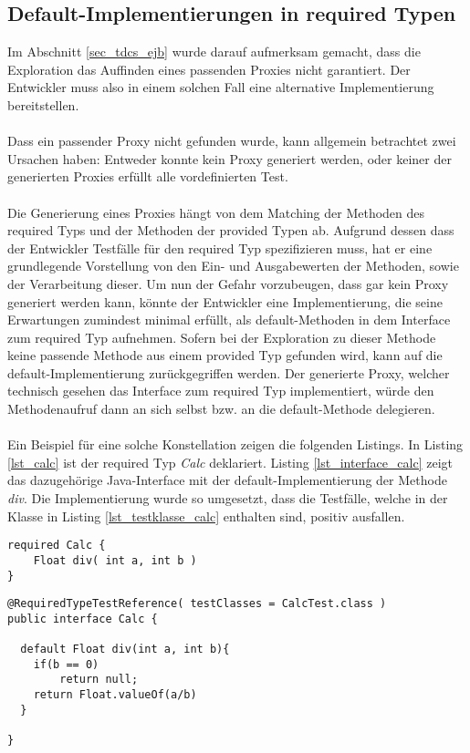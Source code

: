 \subsection{Default-Implementierungen in required Typen}
Im Abschnitt \ref{sec_tdcs_ejb} wurde darauf aufmerksam gemacht, dass die Exploration das Auffinden eines passenden Proxies nicht garantiert. Der Entwickler muss also in einem solchen Fall eine alternative Implementierung bereitstellen.
\\\\
Dass ein passender Proxy nicht gefunden wurde, kann allgemein betrachtet zwei Ursachen haben: Entweder konnte kein Proxy generiert werden, oder keiner der generierten Proxies erfüllt alle vordefinierten Test. 
\\\\
Die Generierung eines Proxies hängt von dem Matching der Methoden des required Typs und der Methoden der provided Typen ab. Aufgrund dessen dass der Entwickler Testfälle für den required Typ spezifizieren muss, hat er eine grundlegende Vorstellung von den Ein- und Ausgabewerten der Methoden, sowie der Verarbeitung dieser. Um nun der Gefahr vorzubeugen, dass gar kein Proxy generiert werden kann, könnte der Entwickler eine Implementierung, die seine Erwartungen zumindest minimal erfüllt, als default-Methoden in dem Interface zum required Typ aufnehmen. Sofern bei der Exploration zu dieser Methode keine passende Methode aus einem provided Typ gefunden wird, kann auf die default-Implementierung zurückgegriffen werden. Der generierte Proxy, welcher technisch gesehen das Interface zum required Typ implementiert, würde den Methodenaufruf dann an sich selbst bzw. an die default-Methode delegieren.
\\\\
Ein Beispiel für eine solche Konstellation zeigen die folgenden Listings. In Listing \ref{lst_calc} ist der required Typ \emph{Calc} deklariert. Listing \ref{lst_interface_calc} zeigt das dazugehörige Java-Interface mit der default-Implementierung der Methode \emph{div}. Die Implementierung wurde so umgesetzt, dass die Testfälle, welche in der Klasse in Listing \ref{lst_testklasse_calc} enthalten sind, positiv ausfallen.
\begin{lstlisting}[caption={Required Typ \emph{Calc}},captionpos=b, style = dsl, label=lst_calc]
required Calc {
	Float div( int a, int b )	
}
\end{lstlisting}
\begin{lstlisting}[style = java, caption = Interface Calc, captionpos = b, label = lst_interface_calc]
@RequiredTypeTestReference( testClasses = CalcTest.class )
public interface Calc {

  default Float div(int a, int b){
  	if(b == 0)
  		return null;
  	return Float.valueOf(a/b)
  }

}
\end{lstlisting}
